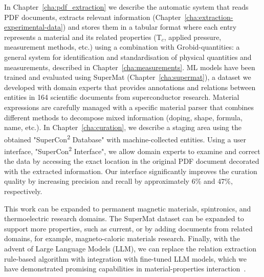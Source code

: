 \documentclass[a4paper,11pt]{report}
\newcommand{\tc}{T$_{c}$}
\begin{document}
In Chapter~\ref{cha:pdf_extraction} we describe the automatic system that reads PDF documents, extracts relevant information (Chapter~\ref{cha:extraction-experimental-data}) and stores them in a tabular format where each entry represents a material and its related properties (\tc, applied pressure, measurement methods, etc.) using a combination with Grobid-quantities: a general system for identification and standardisation of physical quantities and measurements, described in Chapter~\ref{cha:measurements}.
ML models have been trained and evaluated using SuperMat (Chapter~\ref{cha:supermat}), a dataset we developed with domain experts that provides annotations and relations between entities in 164 scientific documents from superconductor research.
Material expressions are carefully managed with a specific material parser that combines different methods to decompose mixed information (doping, shape, formula, name, etc.). 
In Chapter~\ref{cha:curation}, we describe a staging area using the obtained "SuperCon\textsuperscript{2} Database" with machine-collected entities. Using a user interface, "SuperCon\textsuperscript{2} Interface", we allow domain experts to examine and correct the data by accessing the exact location in the original PDF document decorated with the extracted information. 
Our interface significantly improves the curation quality by increasing precision and recall by approximately 6\% and 47\%, respectively.

This work can be expanded to permanent magnetic materials, spintronics, and thermoelectric research domains. 
The SuperMat dataset can be expanded to support more properties, such as current, or by adding documents from related domains, for example, magneto-caloric materials research. 
Finally, with the advent of Large Language Models (LLM), we can replace the relation extraction rule-based algorithm with integration with fine-tuned LLM models, which we have demonstrated promising capabilities in material-properties interaction~\cite{foppiano2024mining}. 


\newpage

{}



\newpage

{}

\end{document}
